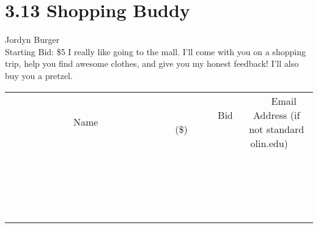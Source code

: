 \documentclass[11pt]{article}
\begin{document}
\section*{3.13 Shopping Buddy}
Jordyn Burger
\\
Starting Bid: \$5
\newline
I really like going to the mall. I'll come with you on a shopping trip, help you find awesome clothes, and give you my honest feedback! I'll also buy you a pretzel.
\\[3ex]
\begin{tabular}{c c c}
~~~~~~~~~~~~~Name~~~~~~~~~~~~~ & ~~~~~~~~~Bid (\$)~~~~~~~~~  & ~~~Email Address (if not standard olin.edu)~~~\\
 & & \\
\hline
 & & \\
\hline
 & & \\
\hline
 & & \\
\hline
 & & \\
\hline
 & & \\
\hline
 & & \\
\hline
 & & \\
\hline
 & & \\
\hline
 & & \\
\hline
 & & \\
\hline
 & & \\
\hline
 & & \\
\hline
 & & \\
\hline
 & & \\
\hline
 & & \\
\hline
 & & \\
\hline
 & & \\
\hline
 & & \\
\hline
\end{tabular}
\newpage
\end{document}
